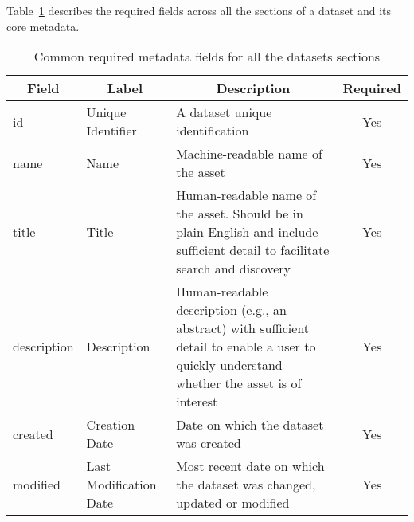 Table~\ref{table:common_sections_metadata} describes the required fields across all the sections of a dataset and its core metadata.

\begin{table}[ht!]
\centering
\begin{adjustwidth}{-.5in}{-.5in}
\small
\begin{tabular}{|l|p{2cm}|p{9cm}|c|}
\hline
\multicolumn{1}{|c|}{{\bf Field}} & \multicolumn{1}{c|}{{\bf Label}} & \multicolumn{1}{c|}{{\bf Description}}                                                                                                        & {\bf Required} \\ \hline
id                                & Unique Identifier                & A dataset unique identification                                                                                                               & Yes            \\ \hline
name                              & Name                             & Machine-readable name of the asset                                                                                                            & Yes            \\ \hline
title                             & Title                            & Human-readable name of the asset. Should be in plain English and include sufficient detail to facilitate search and discovery                 & Yes            \\ \hline
description                       & Description                      & Human-readable description (e.g., an abstract) with sufficient detail to enable a user to quickly understand whether the asset is of interest & Yes            \\ \hline
created                           & Creation Date                    & Date on which the dataset was created                                                                                                         & Yes            \\ \hline
modified                          & Last Modification Date           & Most recent date on which the dataset was changed, updated or modified                                                                        & Yes            \\ \hline
\end{tabular}
\caption{Common required metadata fields for all the datasets sections}
\label{table:common_sections_metadata}
\end{adjustwidth}
\end{table}

